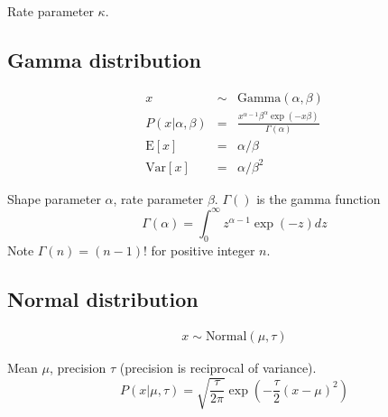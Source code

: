 \documentclass[10pt]{article}
\begin{document}
Rate parameter $\kappa$.


\subsection{Gamma distribution}

\begin{eqnarray*}
x & \sim & \mbox{Gamma}(\alpha,\beta) \\
P(x|\alpha,\beta) & = & \frac{x^{\alpha-1} \beta^\alpha \exp(-x \beta)}{\Gamma(\alpha)} \\
\mbox{E}[x] & = & \alpha/\beta \\
\mbox{Var}[x] & = & \alpha/\beta^2
\end{eqnarray*}

Shape parameter $\alpha$, rate parameter $\beta$.
$\Gamma()$ is the gamma function
\[
\Gamma(\alpha) = \int_0^{\infty} z^{\alpha-1} \exp(-z) dz
\]
Note $\Gamma(n) = (n-1)!$ for positive integer $n$.

\subsection{Normal distribution}

\begin{eqnarray*}
x \sim \mbox{Normal}(\mu,\tau)
\end{eqnarray*}


Mean $\mu$, precision $\tau$ (precision is reciprocal of variance).
\[
P(x|\mu,\tau)
 = \sqrt{\frac{\tau}{2\pi}} \exp \left( -\frac{\tau}{2}(x-\mu)^2 \right)
\]
\end{document}
